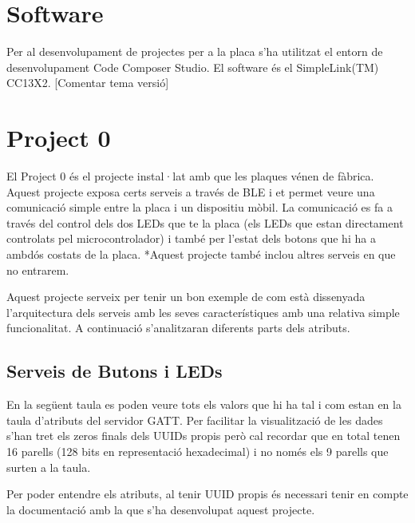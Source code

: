 \section{Software}
Per al desenvolupament de projectes per a la placa s'ha utilitzat el entorn de desenvolupament Code Composer Studio. El software és el SimpleLink(TM) CC13X2.
[Comentar tema versió]

\section{Project 0}
El Project 0 és el projecte instal·lat amb que les plaques vénen de fàbrica. Aquest projecte exposa certs serveis a través de BLE i et permet veure una comunicació simple entre la placa i un dispositiu mòbil.
La comunicació es fa a través del control dels dos LEDs que te la placa (els LEDs que estan directament controlats pel microcontrolador) i també per l'estat dels botons que hi ha a ambdós costats de la placa.
*Aquest projecte també inclou altres serveis en que no entrarem.

Aquest projecte serveix per tenir un bon exemple de com està dissenyada l'arquitectura dels serveis amb les seves característiques amb una relativa simple funcionalitat. A continuació s'analitzaran diferents parts dels atributs.

\subsection{Serveis de Butons i LEDs}

En la següent taula es poden veure tots els valors que hi ha tal i com estan en la taula d'atributs del servidor GATT.
Per facilitar la visualització de les dades s'han tret els zeros finals dels UUIDs propis però cal recordar que en total tenen 16 parells (128 bits en representació hexadecimal) i no només els 9 parells que surten a la taula.

\begin{center}
	\begin{table}[h!]
	\end{table}
\end{center}

Per poder entendre els atributs, al tenir UUID propis és necessari tenir en compte la documentació amb la que s'ha desenvolupat aquest projecte.


